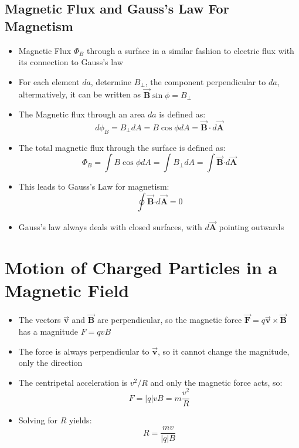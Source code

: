 \documentclass[11pt, a4paper]{article}
\begin{document}
\subsection{Magnetic Flux and Gauss's Law For Magnetism}
\begin{itemize}
    \item Magnetic Flux $\Phi_B$ through a surface in a similar fashion to electric flux
        with its connection to Gauss's law
    \item For each element $da$, determine $B_{\perp}$, the component perpendicular to
        $da$, altermatively, it can be written as $\vec{\mathbf{B}}\sin\phi = B_{\perp}$
    \item The Magnetic flux through an area $da$ is defined as:
        \begin{equation}
            d\phi_B = B_{\perp}dA = B\cos\phi dA = \vec{\mathbf{B}} \cdot
            d\vec{\mathbf{A}}
        \end{equation}
    \item The total magnetic flux through the surface is defined as:
        \begin{equation}
            \Phi_B = \int B\cos\phi dA = \int B_{\perp} dA = 
            \int \vec{\mathbf{B}} \mathbf{\cdot} d\vec{\mathbf{A}}
        \end{equation}
    \item This leads to Gauss's Law for magnetism:
        \begin{equation}
            \oint \vec{\mathbf{B}} \mathbf{\cdot} d\vec{\mathbf{A}} = 0
        \end{equation}
    \item Gauss's law always deals with closed surfaces, with $d\vec{\mathbf{A}}$
        pointing outwards
\end{itemize}

\section[27.4 Motion of Charged Particles in a Magnetic Field]{Motion of Charged
    Particles in a Magnetic Field}
\begin{itemize}
    \item The vectors $\vec{\mathbf{v}}$ and $\vec{\mathbf{B}}$ are perpendicular, so the
        magnetic force $\vec{\mathbf{F}} = q \mathbf{\vec{v} \times \vec{B}}$ has a
        magnitude $F = qvB$ 
    \item The force is always perpendicular to $\vec{\mathbf{v}}$, so it cannot change
        the magnitude, only the direction
    \item The centripetal acceleration is $v^2 / R$ and only the magnetic force acts, so:
        \begin{equation}
            F = |q|vB = m \frac{v^2}{R}
        \end{equation}
    \item Solving for $R$ yields:
        \begin{equation}
            R = \frac{mv}{|q|B}
        \end{equation}
\end{itemize}
\end{document}
